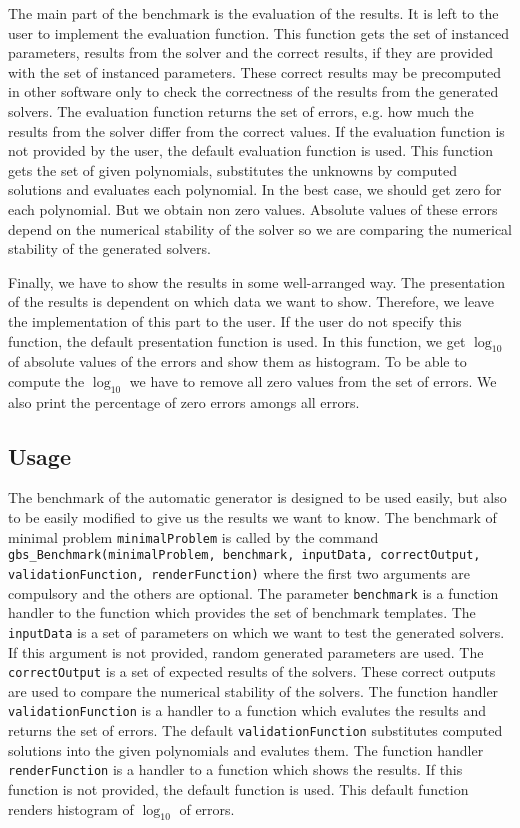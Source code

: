 The main part of the benchmark is the evaluation of the results. It is left to the user to implement the evaluation function. This function gets the set of instanced parameters, results from the solver and the correct results, if they are provided with the set of instanced parameters. These correct results may be precomputed in other software only to check the correctness of the results from the generated solvers. The evaluation function returns the set of errors, e.g. how much the results from the solver differ from the correct values. If the evaluation function is not provided by the user, the default evaluation function is used. This function gets the set of given polynomials, substitutes the unknowns by computed solutions and evaluates each polynomial. In the best case, we should get zero for each polynomial. But we obtain non zero values. Absolute values of these errors depend on the numerical stability of the solver so we are comparing the numerical stability of the generated solvers.

Finally, we have to show the results in some well-arranged way. The presentation of the results is dependent on which data we want to show. Therefore, we leave the implementation of this part to the user. If the user do not specify this function, the default presentation function is used. In this function, we get $\log_{10}$ of absolute values of the errors and show them as histogram. To be able to compute the $\log_{10}$ we have to remove all zero values from the set of errors. We also print the percentage of zero errors amongs all errors.

\subsection{Usage}
The benchmark of the automatic generator is designed to be used easily, but also to be easily modified to give us the results we want to know. The benchmark of minimal problem \texttt{minimalProblem} is called by the command \texttt{gbs\_Benchmark(minimal\-Prob\-lem, bench\-mark, input\-Data, correctOutput, validationFunction, render\-Func\-tion)} where the first two arguments are compulsory and the others are optional. The parameter \texttt{benchmark} is a function handler to the function which provides the set of benchmark templates. The \texttt{input\-Data} is a set of parameters on which we want to test the generated solvers. If this argument is not provided, random generated parameters are used. The \texttt{correctOutput} is a set of expected results of the solvers. These correct outputs are used to compare the numerical stability of the solvers. The function handler \texttt{validationFunction} is a handler to a function which evalutes the results and returns the set of errors. The default \texttt{validationFunction} substitutes computed solutions into the given polynomials and evalutes them. The function handler \texttt{renderFunction} is a handler to a function which shows the results. If this function is not provided, the default function is used. This default function renders histogram of $\log_{10}$ of errors.

